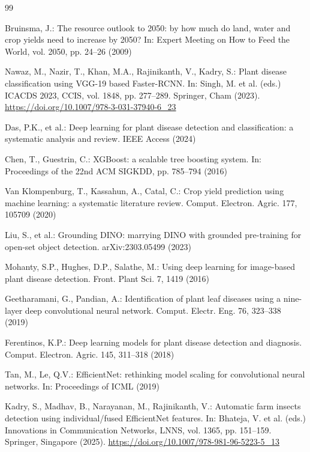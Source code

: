 
\begin{thebibliography}{99}

Bruinsma, J.: The resource outlook to 2050: by how much do land,
water and crop yields need to increase by 2050? In: Expert Meeting
on How to Feed the World, vol. 2050, pp. 24--26 (2009)

Nawaz, M., Nazir, T., Khan, M.A., Rajinikanth, V., Kadry, S.:
Plant disease classification using VGG-19 based Faster-RCNN.
In: Singh, M. et al. (eds.) ICACDS 2023, CCIS, vol. 1848,
pp. 277--289. Springer, Cham (2023).
\url{https://doi.org/10.1007/978-3-031-37940-6_23}

Das, P.K., et al.: Deep learning for plant disease detection and
classification: a systematic analysis and review.
IEEE Access (2024)

Chen, T., Guestrin, C.: XGBoost: a scalable tree boosting system.
In: Proceedings of the 22nd ACM SIGKDD, pp. 785--794 (2016)

Van Klompenburg, T., Kassahun, A., Catal, C.: Crop yield prediction
using machine learning: a systematic literature review.
Comput. Electron. Agric. 177, 105709 (2020)

Liu, S., et al.: Grounding DINO: marrying DINO with grounded
pre-training for open-set object detection.
arXiv:2303.05499 (2023)

Mohanty, S.P., Hughes, D.P., Salathe, M.: Using deep learning for
image-based plant disease detection.
Front. Plant Sci. 7, 1419 (2016)

Geetharamani, G., Pandian, A.: Identification of plant leaf diseases
using a nine-layer deep convolutional neural network.
Comput. Electr. Eng. 76, 323--338 (2019)

Ferentinos, K.P.: Deep learning models for plant disease detection
and diagnosis. Comput. Electron. Agric. 145, 311--318 (2018)

Tan, M., Le, Q.V.: EfficientNet: rethinking model scaling for
convolutional neural networks.
In: Proceedings of ICML (2019)

Kadry, S., Madhav, B., Narayanan, M., Rajinikanth, V.: Automatic
farm insects detection using individual/fused EfficientNet features.
In: Bhateja, V. et al. (eds.) Innovations in Communication
Networks, LNNS, vol. 1365, pp. 151--159. Springer, Singapore (2025).
\url{https://doi.org/10.1007/978-981-96-5223-5_13}


\end{thebibliography}
